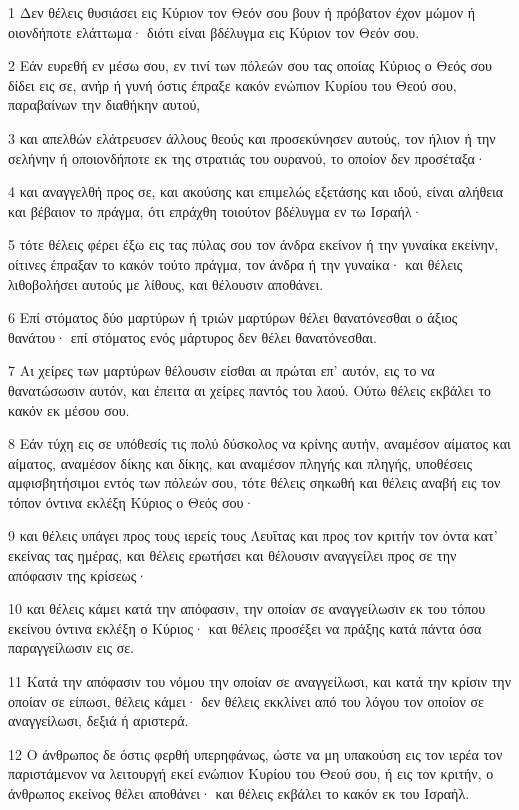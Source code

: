 \par 1 Δεν θέλεις θυσιάσει εις Κύριον τον Θεόν σου βουν ή πρόβατον έχον μώμον ή οιονδήποτε ελάττωμα· διότι είναι βδέλυγμα εις Κύριον τον Θεόν σου.
\par 2 Εάν ευρεθή εν μέσω σου, εν τινί των πόλεών σου τας οποίας Κύριος ο Θεός σου δίδει εις σε, ανήρ ή γυνή όστις έπραξε κακόν ενώπιον Κυρίου του Θεού σου, παραβαίνων την διαθήκην αυτού,
\par 3 και απελθών ελάτρευσεν άλλους θεούς και προσεκύνησεν αυτούς, τον ήλιον ή την σελήνην ή οποιονδήποτε εκ της στρατιάς του ουρανού, το οποίον δεν προσέταξα·
\par 4 και αναγγελθή προς σε, και ακούσης και επιμελώς εξετάσης και ιδού, είναι αλήθεια και βέβαιον το πράγμα, ότι επράχθη τοιούτον βδέλυγμα εν τω Ισραήλ·
\par 5 τότε θέλεις φέρει έξω εις τας πύλας σου τον άνδρα εκείνον ή την γυναίκα εκείνην, οίτινες έπραξαν το κακόν τούτο πράγμα, τον άνδρα ή την γυναίκα· και θέλεις λιθοβολήσει αυτούς με λίθους, και θέλουσιν αποθάνει.
\par 6 Επί στόματος δύο μαρτύρων ή τριών μαρτύρων θέλει θανατόνεσθαι ο άξιος θανάτου· επί στόματος ενός μάρτυρος δεν θέλει θανατόνεσθαι.
\par 7 Αι χείρες των μαρτύρων θέλουσιν είσθαι αι πρώται επ' αυτόν, εις το να θανατώσωσιν αυτόν, και έπειτα αι χείρες παντός του λαού. Ούτω θέλεις εκβάλει το κακόν εκ μέσου σου.
\par 8 Εάν τύχη εις σε υπόθεσίς τις πολύ δύσκολος να κρίνης αυτήν, αναμέσον αίματος και αίματος, αναμέσον δίκης και δίκης, και αναμέσον πληγής και πληγής, υποθέσεις αμφισβητήσιμοι εντός των πόλεών σου, τότε θέλεις σηκωθή και θέλεις αναβή εις τον τόπον όντινα εκλέξη Κύριος ο Θεός σου·
\par 9 και θέλεις υπάγει προς τους ιερείς τους Λευΐτας και προς τον κριτήν τον όντα κατ' εκείνας τας ημέρας, και θέλεις ερωτήσει και θέλουσιν αναγγείλει προς σε την απόφασιν της κρίσεως·
\par 10 και θέλεις κάμει κατά την απόφασιν, την οποίαν σε αναγγείλωσιν εκ του τόπου εκείνου όντινα εκλέξη ο Κύριος· και θέλεις προσέξει να πράξης κατά πάντα όσα παραγγείλωσιν εις σε.
\par 11 Κατά την απόφασιν του νόμου την οποίαν σε αναγγείλωσι, και κατά την κρίσιν την οποίαν σε είπωσι, θέλεις κάμει· δεν θέλεις εκκλίνει από του λόγου τον οποίον σε αναγγείλωσι, δεξιά ή αριστερά.
\par 12 Ο άνθρωπος δε όστις φερθή υπερηφάνως, ώστε να μη υπακούση εις τον ιερέα τον παριστάμενον να λειτουργή εκεί ενώπιον Κυρίου του Θεού σου, ή εις τον κριτήν, ο άνθρωπος εκείνος θέλει αποθάνει· και θέλεις εκβάλει το κακόν εκ του Ισραήλ.
